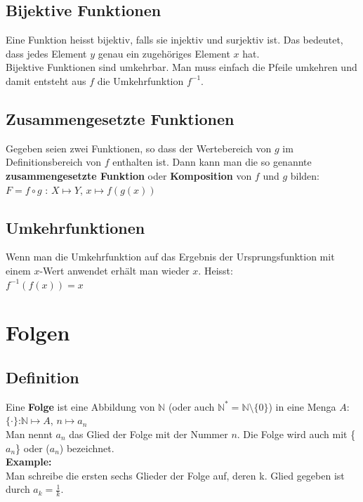 \documentclass[12pt]{scrartcl}
\begin{document}
\subsection{Bijektive Funktionen}
Eine Funktion heisst bijektiv, falls sie injektiv und surjektiv ist. Das bedeutet, dass jedes Element $y$ genau
ein zugehöriges Element $x$ hat.\\

Bijektive Funktionen sind umkehrbar. Man muss einfach die Pfeile umkehren und damit entsteht
aus $f$ die Umkehrfunktion $f^{-1}$.


\subsection{Zusammengesetzte Funktionen}
Gegeben seien zwei Funktionen, so dass der Wertebereich von $g$ im Definitionsbereich von $f$ enthalten ist.
Dann kann man die so genannte \textbf{zusammengesetzte Funktion} oder \textbf{Komposition} von $f$
und $g$ bilden:\\
$F = f \circ g$ : $X \longmapsto Y$, $x \longmapsto f(g(x))$

\subsection{Umkehrfunktionen}
Wenn man die Umkehrfunktion auf das Ergebnis der Ursprungsfunktion mit einem $x$-Wert anwendet
erhält man wieder $x$. Heisst:\\
$f^{-1}(f(x)) = x$


\newpage
\section{Folgen}
\subsection{Definition}
Eine \textbf{Folge} ist eine Abbildung von $\mathbb{N}$ (oder auch $\mathbb{N}^* = \mathbb{N} \setminus \{0\}$) in eine Menga $A$:\\
$\{\cdot\}$:$\mathbb{N} \mapsto A$, $n \mapsto a_n$\\
Man nennt $a_n$ das Glied der Folge mit der Nummer $n$. Die Folge wird auch mit \{$a_n$\} oder ($a_n$) bezeichnet.\\

\textbf{Example:}\\
Man schreibe die ersten sechs Glieder der Folge auf, deren k. Glied gegeben ist durch $a_k = \frac{1}{k}$. \\
\end{document}
